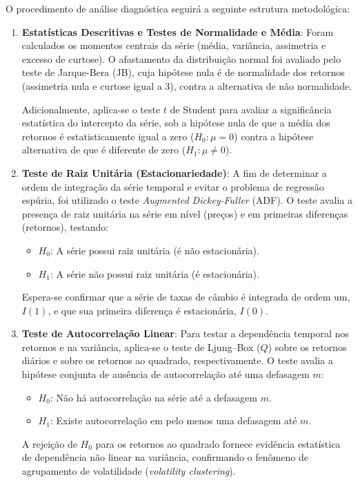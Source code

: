 O procedimento de análise diagnóstica seguirá a seguinte estrutura metodológica:

\begin{enumerate}
    \item \textbf{Estatísticas Descritivas e Testes de Normalidade e Média}: 
    Foram calculados os momentos centrais da série (média, variância, assimetria e excesso de curtose). O afastamento da distribuição normal foi avaliado pelo teste de Jarque-Bera (JB), cuja hipótese nula é de normalidade dos retornos (assimetria nula e curtose igual a 3), contra a alternativa de não normalidade.

    Adicionalmente, aplica-se o teste $t$ de Student para avaliar a significância estatística do intercepto da série, sob a hipótese nula de que a média dos retornos é estatisticamente igual a zero ($H_0: \mu = 0$) contra a hipótese alternativa de que é diferente de zero ($H_1: \mu \neq 0$).

    \item \textbf{Teste de Raiz Unitária (Estacionariedade)}:
    A fim de determinar a ordem de integração da série temporal e evitar o problema de regressão espúria, foi utilizado o teste \textit{Augmented Dickey-Fuller} (ADF). O teste avalia a presença de raiz unitária na série em nível (preços) e em primeiras diferenças (retornos), testando:
    \begin{itemize}
        \item[] $H_0$: A série possui raiz unitária (é não estacionária).
        \item[] $H_1$: A série não possui raiz unitária (é estacionária).
    \end{itemize}
    Espera-se confirmar que a série de taxas de câmbio é integrada de ordem um, $I(1)$, e que sua primeira diferença é estacionária, $I(0)$.

    \item \textbf{Teste de Autocorrelação Linear}:
    Para testar a dependência temporal nos retornos e na variância, aplica-se o teste de Ljung–Box ($Q$) sobre os retornos diários e sobre os retornos ao quadrado, respectivamente. O teste avalia a hipótese conjunta de ausência de autocorrelação até uma defasagem $m$:
    \begin{itemize}
        \item[] $H_0$: Não há autocorrelação na série até a defasagem $m$.
        \item[] $H_1$: Existe autocorrelação em pelo menos uma defasagem até $m$.
    \end{itemize}
    A rejeição de $H_0$ para os retornos ao quadrado fornece evidência estatística de dependência não linear na variância, confirmando o fenômeno de agrupamento de volatilidade (\textit{volatility clustering}).


\end{enumerate}
